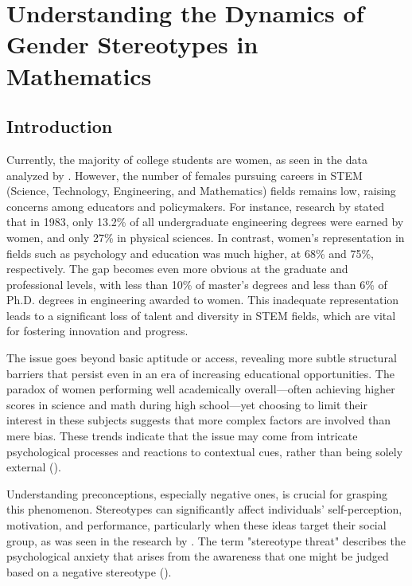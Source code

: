 \chapter{Understanding the Dynamics of Gender Stereotypes in Mathematics}\label{chap:SocialScience}
\section{Introduction}
Currently, the majority of college students are women, as seen in the data analyzed by \textcite{OWID2024}. However, the number of females pursuing careers in STEM (Science, Technology, Engineering, and Mathematics) fields remains low, raising concerns among educators and policymakers.
For instance, research by \textcite{eccles1989} stated that in 1983, only 13.2\% of all undergraduate engineering degrees were earned by women, and only 27\% in physical sciences. In contrast, women's representation in fields such as psychology and education was much higher, at 68\% and 75\%, respectively. The gap becomes even more obvious at the graduate and professional levels, with less than 10\% of master's degrees and less than 6\% of Ph.D. degrees in engineering awarded to women. This inadequate representation leads to a significant loss of talent and diversity in STEM fields, which are vital for fostering innovation and progress.

The issue goes beyond basic aptitude or access, revealing more subtle structural barriers that persist even in an era of increasing educational opportunities. The paradox of women performing well academically overall—often achieving higher scores in science and math during high school—yet choosing to limit their interest in these subjects suggests that more complex factors are involved than mere bias. These trends indicate that the issue may come from intricate psychological processes and reactions to contextual cues, rather than being solely external (\cite{Monteiro2023}).

Understanding preconceptions, especially negative ones, is crucial for grasping this phenomenon. Stereotypes can significantly affect individuals' self-perception, motivation, and performance, particularly when these ideas target their social group, as was seen in the research by \textcite{HEILMAN2012113}. The term "stereotype threat" describes the psychological anxiety that arises from the awareness that one might be judged based on a negative stereotype (\cite{Spencer2016}).

